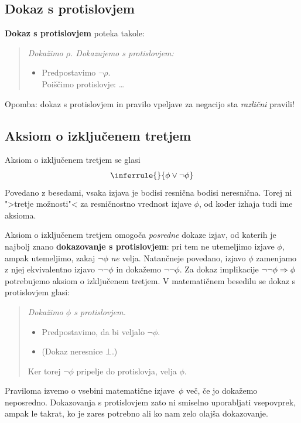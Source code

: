 \subsection{Dokaz s protislovjem}

\textbf{Dokaz s protislovjem} poteka takole:
%
\begin{quote}
  \sl
  Dokažimo $\rho$. Dokazujemo s protislovjem:
  \begin{itemize}
  \item[] Predpostavimo $\lnot\rho$.\\
        Poiščimo protislovje: \quad \dots
  \end{itemize}
\end{quote}
%
Opomba: dokaz s protislovjem in pravilo vpeljave za negacijo sta \emph{različni}
pravili!

\subsection{Aksiom o izključenem tretjem}

\label{sec:lem}

Aksiom o izključenem tretjem se glasi
%
\begin{equation*}
  \inferrule{ }{\phi \lor \lnot \phi}
\end{equation*}
%
Povedano z besedami, vsaka izjava je bodisi resnična bodisi
neresnična. Torej ni ">tretje možnosti"< za resničnostno vrednost
izjave $\phi$, od koder izhaja tudi ime aksioma.

Aksiom o izključenem tretjem omogoča \emph{posredne} dokaze izjav, od
katerih je najbolj znano \textbf{dokazovanje s protislovjem}: pri tem ne
utemeljimo izjave $\phi$, ampak utemeljimo, zakaj $\lnot\phi$
\emph{ne} velja. Natančneje povedano, izjavo $\phi$ zamenjamo z njej
ekvivalentno izjavo $\lnot\lnot\phi$ in dokažemo $\lnot\lnot\phi$.
Za dokaz implikacije $\lnot\lnot\phi \Rightarrow \phi$ potrebujemo aksiom o
izključenem tretjem. V matematičnem besedilu se dokaz s protislovjem
glasi:
%
\begin{quote}
  \it
  Dokažimo $\phi$ s protislovjem.
  \begin{itemize}
  \item[] Predpostavimo, da bi veljalo $\lnot\phi$.
  \item[] (Dokaz neresnice $\bot$.)
  \end{itemize}
  Ker torej $\lnot\phi$ pripelje do protislovja, velja $\phi$.
\end{quote}
%
Praviloma izvemo o vsebini matematične izjave~$\phi$ več, če jo
dokažemo neposredno. Dokazovanja s protislovjem zato ni smiselno
uporabljati vsepovprek, ampak le takrat, ko je zares potrebno ali ko
nam zelo olajša dokazovanje.

